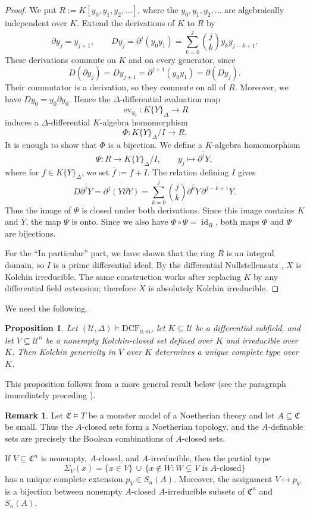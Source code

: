 \documentclass[11pt,a4paper]{amsart}
\newtheorem{proposition}[theorem]{Proposition}
\theoremstyle{definition}
\newtheorem{remark}[theorem]{Remark}
\begin{document}
\begin{proof}
We put $R:=K[y_0,y_1,y_2,\ldots]$, where the $y_0,y_1,y_2,\ldots$ are algebraically
independent over $K$. Extend the derivations of $K$ to $R$ by
\[
\partial y_j=y_{j+1},
\qquad
Dy_j=\partial^j(y_0y_1)
=\sum_{k=0}^{j}\binom{j}{k}y_ky_{j-k+1}.
\]
These derivations commute on $K$ and on every generator, since
\[
D(\partial y_j)=Dy_{j+1}
=\partial^{j+1}(y_0y_1)=\partial(Dy_j).
\]
Their commutator is a derivation, so they commute on all of $R$.
Moreover, we have $Dy_0=y_0\partial y_0$. Hence the $\Delta$-differential evaluation map 
\[
\operatorname{ev}_{y_0}:K\{Y\}_\Delta\longrightarrow R
\]
induces a $\Delta$-differential $K$-algebra homomorphism
\[
\Phi:K\{Y\}_{\Delta}/I\longrightarrow R.
\]
It is enough to show that $\Phi$ is a bijection. We define a $K$-algebra homomorphism
\[
\Psi:R\longrightarrow K\{Y\}_{\Delta}/I,
\qquad
y_j\longmapsto\overline{\partial^jY},
\]
where for $f\in K\{Y\}_{\Delta}$, we set $\bar{f}:=f+I$. The relation defining $I$ gives
\[
D\overline{\partial^jY}
=\overline{\partial^j(Y\partial Y)}
=\sum_{k=0}^{j}\binom{j}{k}
  \overline{\partial^kY}\,
  \overline{\partial^{j-k+1}Y}.
\]
Thus the image of $\Psi$ is closed under both derivations.
Since this image contains $K$ and $\overline Y$, the map $\Psi$ is onto.
Since we also have $\Phi\circ\Psi=\operatorname{id}_R$, both maps $\Phi$ and $\Psi$ are bijections.

For the ``In particular'' part, we have shown that the ring $R$ is an integral domain, so $I$ is a prime differential
ideal. By the differential Nullstellensatz
\cite[Chapter~IV, \S3, Theorem~2, p.~147]{Kolchin},
 $X$ is Kolchin
irreducible. The same construction works after replacing $K$ by
any differential field extension; therefore $X$ is absolutely
Kolchin irreducible.
\end{proof}
We need the following.
\begin{proposition}
Let $(\mathcal U,\Delta)\models\mathrm{DCF}_{0,m}$, let
$K\subseteq\mathcal U$ be a differential subfield, and let
$V\subseteq\mathcal U^n$ be a nonempty Kolchin-closed set defined
over $K$ and irreducible over $K$. Then Kolchin genericity in $V$
over $K$ determines a unique complete type over $K$.
\end{proposition}
This proposition follows from a more general result below (see the paragraph immediately preceding \cite[Proposition 4.7]{HK}).
\begin{remark}
Let 
$\mathfrak C\models T$ be a monster model of a Noetherian theory and let
$A\subseteq\mathfrak C$ be small. Thus the $A$-closed sets form
a Noetherian topology, and the $A$-definable sets are precisely
the Boolean combinations of $A$-closed sets.

If $V\subseteq\mathfrak C^n$ is nonempty, $A$-closed, and
$A$-irreducible, then the partial type
\[
 \Sigma_V(x)
 =
 \{x\in V\}
 \,\cup\,
 \{x\notin W:
     W\subsetneq V\text{ is }A\text{-closed}\}
\]
has a unique complete extension $p_V\in S_n(A)$. Moreover, the assignment $V\mapsto p_V$ is a bijection between
nonempty $A$-closed $A$-irreducible subsets of $\mathfrak C^n$
and $S_n(A)$.
\end{remark}
\end{document}
